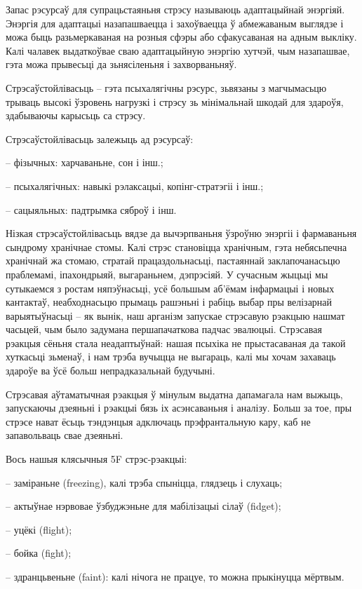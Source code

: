 Запас рэсурсаў для супрацьстаяньня стрэсу называюць адаптацыйнай энэргіяй. Энэргія для адаптацыі назапашваецца і захоўваецца ў абмежаваным выглядзе і можа быць разьмеркаваная на розныя сфэры або сфакусаваная на адным выкліку. Калі чалавек выдаткоўвае сваю адаптацыйную энэргію хутчэй, чым назапашвае, гэта можа прывесьці да зьнясіленьня і захворваньняў.

Стрэсаўстойлівасьць – гэта псыхалягічны рэсурс, зьвязаны з магчымасьцю трываць высокі ўзровень нагрузкі і стрэсу зь мінімальнай шкодай для здароўя, здабываючы карысьць са стрэсу. 

Стрэсаўстойлівасьць залежыць ад рэсурсаў: 

– фізычных: харчаваньне, сон і інш.;

– псыхалягічных: навыкі рэлаксацыі, копінг-стратэгіі і інш.;

– сацыяльных: падтрымка сяброў і інш.

Нізкая стрэсаўстойлівасьць вядзе да вычэрпваньня ўзроўню энэргіі і фармаваньня сындрому хранічнае стомы. Калі стрэс становіцца хранічным, гэта небясьпечна хранічнай жа стомаю, стратай працаздольнасьці, пастаяннай заклапочанасьцю праблемамі, іпахондрыяй, выгараньнем, дэпрэсіяй. У сучасным жыцьці мы сутыкаемся з ростам няпэўнасьці, усё большым аб'ёмам інфармацыі і новых кантактаў, неабходнасьцю прымаць рашэньні і рабіць выбар пры велізарнай варыятыўнасьці – як вынік, наш арганізм запускае стрэсавую рэакцыю нашмат часьцей, чым было задумана першапачаткова падчас эвалюцыі. Стрэсавая рэакцыя сёньня стала неадаптыўнай: нашая псыхіка не прыстасаваная да такой хуткасьці зьменаў, і нам трэба вучыцца не выгараць, калі мы хочам захаваць здароўе ва ўсё больш непрадказальнай будучыні.

Стрэсавая аўтаматычная рэакцыя ў мінулым выдатна дапамагала нам выжыць, запускаючы дзеяньні і рэакцыі бязь іх асэнсаваньня і аналізу. Больш за тое, пры стрэсе нават ёсьць тэндэнцыя адключаць прэфрантальную кару, каб не запавольваць свае дзеяньні. 

Вось нашыя клясычныя 5F стрэс-рэакцыі: 

– заміраньне (freezing), калі трэба спыніцца, глядзець і слухаць;

– актыўнае нэрвовае ўзбуджэньне для мабілізацыі сілаў (fidget);

– уцёкі (flight);

– бойка (fight);

– здранцьвеньне (faint): калі нічога не працуе, то можна прыкінуцца мёртвым.

